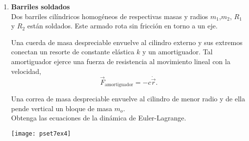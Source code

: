 \documentclass[11pt, spanish, a4paper, twoside]{article}
\begin{document}
\begin{enumerate}
\begin{minipage}[t][6cm]{0.6\textwidth}
Pregunta conceptual:
¿Cuales es la unidad de la fuerza generalizada?
\begin{tasks}(5)
	\task \si{\newton}
	\task \si{\newton \over \metre}
	\task \si{\newton \metre}
	\task Otra
\end{tasks}
Obtenga las ecuaciones de la dinámica de Euler-Lagrange. 
\end{minipage}
\begin{minipage}[c][1cm][t]{0.35\textwidth}
	\texttt{[image: pset7ex2]}
\end{minipage}



\item
\begin{minipage}[t][6cm]{0.6\textwidth}
\textbf{Barriles soldados}\\
Dos barriles cilíndricos homogéneos de respectivas masas y radios $m_1$,$m_2$, $R_1$ y $R_2$ están soldados.
Este armado rota sin fricción en torno a un eje.

Una cuerda de masa despreciable envuelve al cilindro externo y sus extremos conectan un resorte de constante elástica $k$ y un amortiguador.
Tal amortiguador ejerce una fuerza de resistencia al movimiento lineal con la velocidad,
$$
\vec{F}_\mathrm{amortiguador} = - c \dot{\vec{r}}.
$$

Una correa de masa despreciable envuelve al cilindro de menor radio y de ella pende vertical un bloque de masa $m_o$.\\
Obtenga las ecuaciones de la dinámica de Euler-Lagrange. 
\end{minipage}
\begin{minipage}[c][1cm][t]{0.35\textwidth}
	\texttt{[image: pset7ex4]}
\end{minipage}




\end{enumerate}
\end{document}
